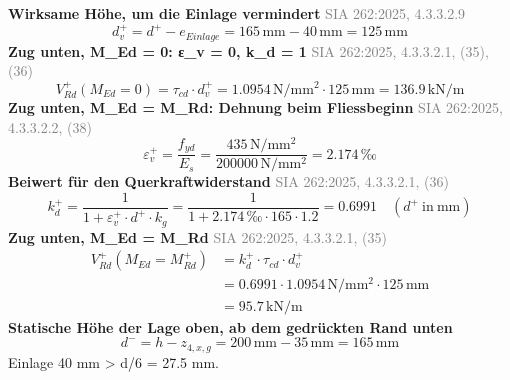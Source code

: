 \documentclass[11pt,a4paper]{article}
\newcommand{\normref}[1]{{\small\textcolor{gray}{#1}}}
\begin{document}
\noindent\textbf{Wirksame Höhe, um die Einlage vermindert} \hfill \normref{SIA 262:2025, 4.3.3.2.9}
\begin{equation*}
d_v^{+} = d^{+} - e_{Einlage} = 165\,\mathrm{mm} - 40\,\mathrm{mm} = 125\,\mathrm{mm}
\end{equation*}
\noindent\textbf{Zug unten, M\_Ed = 0: ε\_v = 0, k\_d = 1} \hfill \normref{SIA 262:2025, 4.3.3.2.1, (35), (36)}
\begin{equation*}
V_{Rd}^{+}(M_{Ed} = 0) = \tau_{cd} \cdot d_v^{+} = 1.0954\,\mathrm{N}/\mathrm{mm}^{2} \cdot 125\,\mathrm{mm} = 136.9\,\mathrm{kN}/\mathrm{m}
\end{equation*}
\noindent\textbf{Zug unten, M\_Ed = M\_Rd: Dehnung beim Fliessbeginn} \hfill \normref{SIA 262:2025, 4.3.3.2.2, (38)}
\begin{equation*}
\varepsilon_v^{+} = \frac{f_{yd}}{E_s} = \frac{435\,\mathrm{N}/\mathrm{mm}^{2}}{200000\,\mathrm{N}/\mathrm{mm}^{2}} = 2.174\,\text{‰}
\end{equation*}
\noindent\textbf{Beiwert für den Querkraftwiderstand} \hfill \normref{SIA 262:2025, 4.3.3.2.1, (36)}
\begin{equation*}
k_d^{+} = \frac{1}{1 + \varepsilon_v^{+} \cdot d^{+} \cdot k_g} = \frac{1}{1 + 2.174\,\text{‰} \cdot 165 \cdot 1.2} = 0.6991 \quad \left(d^{+}\ \text{in}\ \mathrm{mm}\right)
\end{equation*}
\noindent\textbf{Zug unten, M\_Ed = M\_Rd} \hfill \normref{SIA 262:2025, 4.3.3.2.1, (35)}
\begin{equation*}
\begin{aligned}
  V_{Rd}^{+}(M_{Ed} = M_{Rd}^{+}) &= k_d^{+} \cdot \tau_{cd} \cdot d_v^{+} \\
  &= 0.6991 \cdot 1.0954\,\mathrm{N}/\mathrm{mm}^{2} \cdot 125\,\mathrm{mm} \\
  &= 95.7\,\mathrm{kN}/\mathrm{m}
\end{aligned}
\end{equation*}
\noindent\textbf{Statische Höhe der Lage oben, ab dem gedrückten Rand unten}
\begin{equation*}
d^{-} = h - z_{4,x,g} = 200\,\mathrm{mm} - 35\,\mathrm{mm} = 165\,\mathrm{mm}
\end{equation*}
Einlage 40 mm > d/6 = 27.5 mm.
\end{document}

